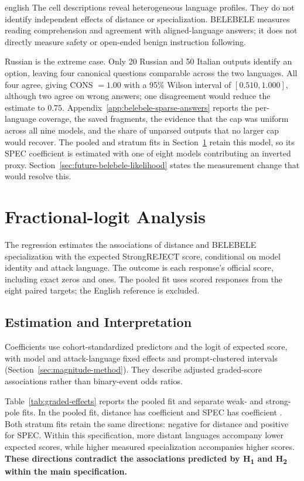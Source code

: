 \begin{otherlanguage*}{english}
The cell descriptions reveal heterogeneous language profiles. They do not identify independent effects of distance or specialization. BELEBELE measures reading comprehension and agreement with aligned-language answers; it does not directly measure safety or open-ended benign instruction following.

Russian is the extreme case. Only 20 Russian and 50 Italian outputs identify an option, leaving four canonical questions comparable across the two languages. All four agree, giving CONS $=1.00$ with a 95\% Wilson interval of $[0.510,1.000]$, although two agree on wrong answers; one disagreement would reduce the estimate to $0.75$. Appendix~\ref{app:belebele-sparse-answers} reports the per-language coverage, the saved fragments, the evidence that the cap was uniform across all nine models, and the share of unparsed outputs that no larger cap would recover. The pooled and stratum fits in Section~\ref{sec:graded-inference} retain this model, so its SPEC coefficient is estimated with one of eight models contributing an inverted proxy. Section~\ref{sec:future-belebele-likelihood} states the measurement change that would resolve this.

\section{Fractional-logit Analysis}
\label{sec:graded-inference}

The regression estimates the associations of distance and BELEBELE specialization with the expected StrongREJECT score, conditional on model identity and attack language. The outcome is each response's official score, including exact zeros and ones. The pooled fit uses \GMainN{} scored responses from the eight paired targets; the English reference is excluded.

\subsection{Estimation and Interpretation}

Coefficients use cohort-standardized predictors and the logit of expected score, with model and attack-language fixed effects and prompt-clustered intervals (Section~\ref{sec:magnitude-method}). They describe adjusted graded-score associations rather than binary-event odds ratios.

\GradedEffectsTable

Table~\ref{tab:graded-effects} reports the pooled fit and separate weak- and strong-pole fits. In the pooled fit, distance has coefficient \GDistanceInterval{} and SPEC has coefficient \GSpecInterval{}. Both stratum fits retain the same directions: negative for distance and positive for SPEC. Within this specification, more distant languages accompany lower expected scores, while higher measured specialization accompanies higher scores. \textbf{These directions contradict the associations predicted by H\textsubscript{1} and H\textsubscript{2} within the main specification.}


\end{otherlanguage*}
